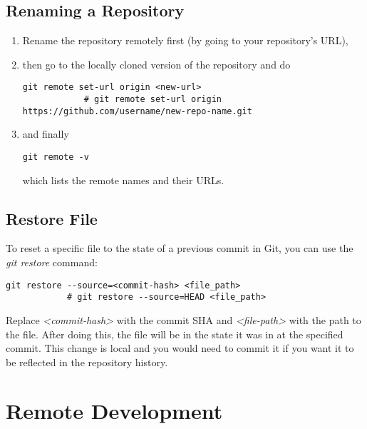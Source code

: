 \documentclass[12pt, a4paper]{article}
\numberwithin{equation}{section}
\theoremstyle{definition}
\theoremstyle{definition}
\begin{document}
	\subsection{Renaming a Repository}
	
	\begin{enumerate}
		\item Rename the repository remotely first (by going to your repository's URL), 
		\item then go to the locally cloned version of the repository and do
		
		\begin{lstlisting}[style=mystylebash, label=alg:git__rename_repo, xleftmargin=\parindent]
			git remote set-url origin <new-url>
			# git remote set-url origin https://github.com/username/new-repo-name.git 
		\end{lstlisting}
		
		\item and finally 
		
		\begin{lstlisting}[style=mystylebash, label=alg:git__check_remote_url, xleftmargin=\parindent]
			git remote -v
		\end{lstlisting}
		
		which lists the remote names and their URLs.
		
	\end{enumerate}

	\subsection{Restore File}
	
		To reset a specific file to the state of a previous commit in Git, you can use the \textit{git restore} command:
		
		\begin{lstlisting}[style=mystylebash, label=alg:git_restore, xleftmargin=\parindent]
			git restore --source=<commit-hash> <file_path>
			# git restore --source=HEAD <file_path>
		\end{lstlisting}
		
		\noindent Replace \textit{<commit-hash>} with the commit SHA and \textit{<file-path>} with the path to the file. After doing this, the file will be in the state it was in at the specified commit. This change is local and you would need to commit it if you want it to be reflected in the repository history.
	
	\newpage 
	
	\section{Remote Development}
	
\end{document}
